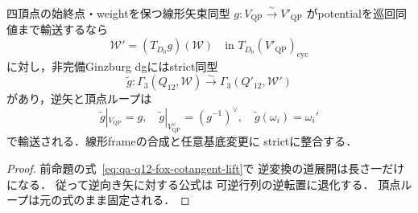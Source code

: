 \begin{corollary}[線形frame変更の場合]
\label{prop:qa-q12-ginzburg-linear-frame-strict-naturality}
四頂点の始終点・weightを保つ線形矢束同型
$g:V_{\mathrm{QP}}\xrightarrow{\sim}V'_{\mathrm{QP}}$
がpotentialを巡回同値まで輸送するなら
\[
 \mathcal W'=(T_{D_0}g)(\mathcal W)
 \quad\text{in }T_{D_0}(V'_{\mathrm{QP}})_{\mathrm{cyc}}
 \tag{LF}\label{eq:qa-q12-ginzburg-linear-frame-potential}
\]
に対し，非完備Ginzburg dgにはstrict同型
\[
 \widetilde g:
 \Gamma_3(Q_{12},\mathcal W)
 \xrightarrow{\sim}
 \Gamma_3(Q'_{12},\mathcal W')
 \tag{LG}\label{eq:qa-q12-ginzburg-linear-frame-dg}
\]
があり，逆矢と頂点ループは
\[
 \widetilde g|_{V_{\mathrm{QP}}}=g,\quad
 \widetilde g|_{V_{\mathrm{QP}}^{\vee}}=(g^{-1})^\vee,\quad
 \widetilde g(\omega_i)=\omega_i'
 \tag{LT}\label{eq:qa-q12-ginzburg-linear-dual-weights}
\]
で輸送される．線形frameの合成と任意基底変更に
strictに整合する．
\end{corollary}
\begin{proof}
前命題の式~\eqref{eq:qa-q12-fox-cotangent-lift}で
逆変換の道展開は長さ一だけになる．
従って逆向き矢に対する公式は
可逆行列の逆転置に退化する．
頂点ループは元の式のまま固定される．
\end{proof}

